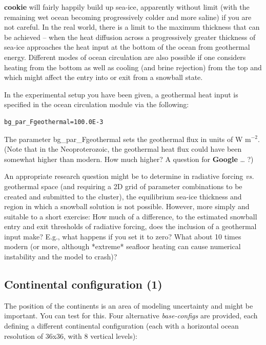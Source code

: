 \textbf{cookie} will fairly happily build up sea-ice, apparently without limit (with the remaining wet ocean becoming progressively colder and more saline) if you are not careful. In the real world, there is a limit to the maximum thickness that can be achieved -- when the heat diffusion across a progressively greater thickness of sea-ice approaches the heat input at the bottom of the ocean from geothermal energy. Different modes of ocean circulation are also possible if one considers heating from the bottom as well as cooling (and brine rejection) from the top and which might affect the entry into or exit from a snowball state.

In the experimental setup you have been given, a geothermal heat input is specified in the ocean circulation module via the following:

\vspace{-2mm}\small\begin{verbatim}
bg_par_Fgeothermal=100.0E-3
\end{verbatim}\normalsize\vspace{-2mm}
The parameter \textsf{\footnotesize bg\_par\_Fgeothermal} sets the geothermal flux in units of W m$^{-2}$. (Note that in the Neoproterozoic, the geothermal heat flux could have been somewhat higher than modern. How much higher? A question for \textbf{Google} … ?)

An appropriate research question might be to determine in radiative forcing \textit{vs.} geothermal space (and requiring a 2D grid of parameter combinations to be created and submitted to the cluster), the equilibrium sea-ice thickness and region in which a snowball solution is not possible. However, more simply and suitable to a short exercise: How much of a difference, to the estimated snowball entry and exit thresholds of radiative forcing, does the inclusion of a geothermal input make? E.g., what happens if you set it to zero? What about 10 times modern (or more, although *extreme* seafloor heating can cause numerical instability and the model to crash)?

\newpage

\subsection{Continental configuration (1)}

The position of the continents is an area of modeling uncertainty and might be important. You can test for this. Four alternative \textit{base-configs} are provided, each defining a different continental configuration (each with a horizontal ocean resolution of 36x36, with 8 vertical levels):

